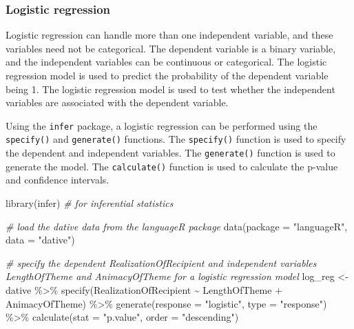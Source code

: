 \documentclass[
  letterpaper,
]{scrbook}
\newenvironment{Shaded}{\begin{snugshade}}{\end{snugshade}}
\newcommand{\AttributeTok}[1]{\textcolor[rgb]{0.00,0.00,0.00}{#1}}
\newcommand{\CommentTok}[1]{\textcolor[rgb]{0.00,0.00,0.00}{\textit{#1}}}
\newcommand{\FunctionTok}[1]{\textcolor[rgb]{0.00,0.00,0.00}{#1}}
\newcommand{\NormalTok}[1]{\textcolor[rgb]{0.00,0.00,0.00}{#1}}
\newcommand{\OtherTok}[1]{\textcolor[rgb]{0.00,0.00,0.00}{#1}}
\newcommand{\SpecialCharTok}[1]{\textcolor[rgb]{0.00,0.00,0.00}{#1}}
\newcommand{\StringTok}[1]{\textcolor[rgb]{0.00,0.00,0.00}{#1}}
\begin{document}
\hypertarget{ida-logistic-regression}{%
\subsubsection{Logistic regression}\label{ida-logistic-regression}}

Logistic regression can handle more than one independent variable, and
these variables need not be categorical. The dependent variable is a
binary variable, and the independent variables can be continuous or
categorical. The logistic regression model is used to predict the
probability of the dependent variable being 1. The logistic regression
model is used to test whether the independent variables are associated
with the dependent variable.

Using the \texttt{infer} package, a logistic regression can be performed
using the \texttt{specify()} and \texttt{generate()} functions. The
\texttt{specify()} function is used to specify the dependent and
independent variables. The \texttt{generate()} function is used to
generate the model. The \texttt{calculate()} function is used to
calculate the p-value and confidence intervals.

\begin{Shaded}
\begin{Highlighting}[]
\FunctionTok{library}\NormalTok{(infer) }\CommentTok{\# for inferential statistics}

\CommentTok{\# load the \textasciigrave{}dative\textasciigrave{} data from the \textasciigrave{}languageR\textasciigrave{} package}
\FunctionTok{data}\NormalTok{(}\AttributeTok{package =} \StringTok{"languageR"}\NormalTok{, }\AttributeTok{data =} \StringTok{"dative"}\NormalTok{)}

\CommentTok{\# specify the dependent \textasciigrave{}RealizationOfRecipient\textasciigrave{} and independent variables \textasciigrave{}LengthOfTheme\textasciigrave{} and \textasciigrave{}AnimacyOfTheme\textasciigrave{} for a logistic regression model}
\NormalTok{log\_reg }\OtherTok{\textless{}{-}} 
\NormalTok{  dative }\SpecialCharTok{\%\textgreater{}\%}
  \FunctionTok{specify}\NormalTok{(RealizationOfRecipient }\SpecialCharTok{\textasciitilde{}}\NormalTok{ LengthOfTheme }\SpecialCharTok{+}\NormalTok{ AnimacyOfTheme) }\SpecialCharTok{\%\textgreater{}\%}
  \FunctionTok{generate}\NormalTok{(}\AttributeTok{response =} \StringTok{"logistic"}\NormalTok{, }\AttributeTok{type =} \StringTok{"response"}\NormalTok{) }\SpecialCharTok{\%\textgreater{}\%}
  \FunctionTok{calculate}\NormalTok{(}\AttributeTok{stat =} \StringTok{"p.value"}\NormalTok{, }\AttributeTok{order =} \StringTok{"descending"}\NormalTok{)}
\end{Highlighting}
\end{Shaded}
\end{document}
